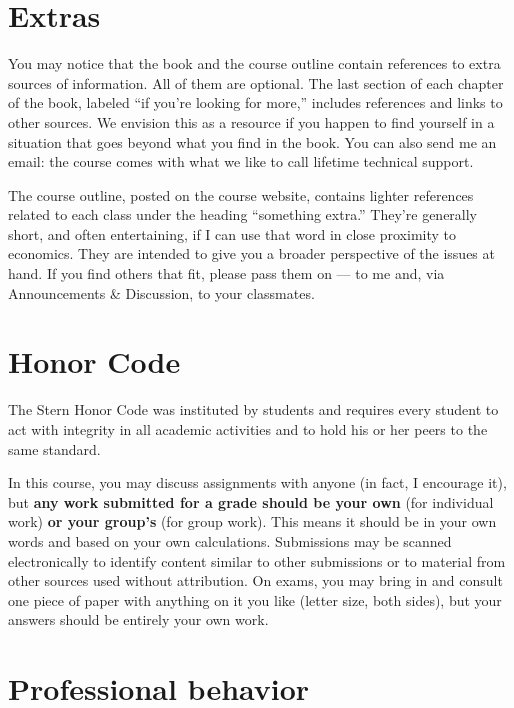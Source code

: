 \documentclass[12pt]{article}
\begin{document}
\section{Extras}

You may notice that the book and the course outline contain references to
extra sources of information.
All of them are optional. 
The last section of each chapter of the book,
labeled ``if you're looking for more,''
includes references and links to other sources.
We envision this as a resource if you happen to find yourself in
a situation that goes beyond what you find in the book.
You can also send me an email:  the course comes with what we like
to call lifetime technical support.

The course outline, posted on the course website,
contains lighter references related to each class
under the heading ``something extra.''
They're generally short, and often entertaining,
if I can use that word in close proximity to economics.
They are intended
to give you a broader perspective of the issues at hand.
If you find others that fit, please pass them on ---
to me and, via Announcements \& Discussion, to your classmates.


\section{Honor Code}

The Stern Honor Code was instituted by students
and requires every student to act with integrity in all
academic activities and to hold his or her peers to the same
standard.

In this course, you may discuss assignments with anyone
(in fact, I encourage it), but {\bf any work submitted for a
grade should be your own} (for individual work) {\bf or your group's}
(for group work).
This means it should be in your own words and based on your own calculations.
Submissions may be scanned electronically to identify
content similar to other submissions or to material from other sources
used without attribution.
On exams, you may bring in and consult one piece
of paper with anything on it you like (letter size, both sides),
but your answers should be entirely your own work.




\section{Professional behavior}
\end{document}
